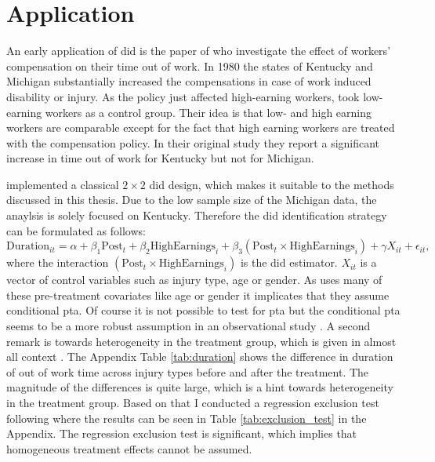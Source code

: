 \section{Application}

An early application of \ac{did} is the paper of \citet{meyer1990workers} who investigate the effect of workers' compensation on their time out of work.
In 1980 the states of Kentucky and Michigan substantially increased the compensations in case of work induced disability or injury.
As the policy just affected high-earning workers, \citet{meyer1990workers} took low-earning workers as a control group.
Their idea is that low- and high earning workers are comparable except for the fact that high earning workers are treated with the compensation policy.
In their original study they report a significant increase in time out of work for Kentucky but not for Michigan.

\citet{meyer1990workers} implemented a classical $2 \times 2$ \ac{did} design, which makes it suitable to the methods discussed in this thesis.
Due to the low sample size of the Michigan data, the anaylsis is solely focused on Kentucky.
Therefore the \ac{did} identification strategy can be formulated as follows:
\begin{equation}
\text{Duration}_{it} = \alpha + \beta_1 \text{Post}_t + \beta_2 \text{HighEarnings}_i + \beta_3 (\text{Post}_t \times \text{HighEarnings}_i) + \gamma X_{it} + \epsilon_{it},
\label{eq:duration}
\end{equation}
where the interaction $(\text{Post}_t \times \text{HighEarnings}_i)$ is the \ac{did} estimator.
$X_{it}$ is a vector of control variables such as injury type, age or gender.
As \citet{meyer1990workers} uses many of these pre-treatment covariates like age or gender it implicates that they assume conditional \ac{pta}.
Of course it is not possible to test for \ac{pta} but the conditional \ac{pta} seems to be a more robust assumption in an observational study \citep{santannaDoublyRobustDifferenceindifferences2020}.
A second remark is towards heterogeneity in the treatment group, which is given in almost all context \citep{DeepLearningIndividual2021}.
The Appendix Table \ref{tab:duration} shows the difference in duration of out of work time across injury types before and after the treatment.
The magnitude of the differences is quite large, which is a hint towards heterogeneity in the treatment group.
Based on that I conducted a regression exclusion test following \citet{hansen2022econometrics} where the results can be seen in Table \ref{tab:exclusion_test} in the Appendix.
The regression exclusion test is significant, which implies that homogeneous treatment effects cannot be assumed.


